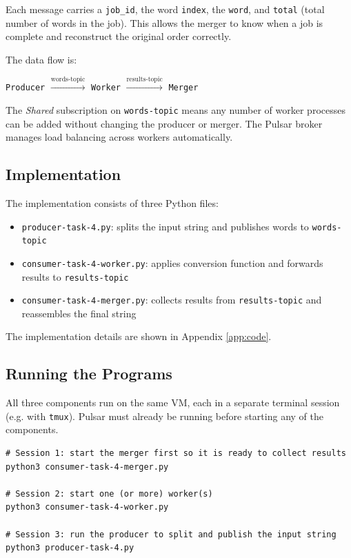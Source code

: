 \documentclass[11pt,a4paper]{article}
\begin{document}
Each message carries a \texttt{job\_id}, the word \texttt{index}, the \texttt{word}, and
\texttt{total} (total number of words in the job). This allows the merger to know when a job
is complete and reconstruct the original order correctly.

The data flow is:

\begin{center}
  \texttt{Producer} $\xrightarrow{\text{words-topic}}$ \texttt{Worker} $\xrightarrow{\text{results-topic}}$ \texttt{Merger}
\end{center}

The \textit{Shared} subscription on \texttt{words-topic} means any number of worker
processes can be added without changing the producer or merger. The Pulsar broker manages
load balancing across workers automatically.

\subsection{Implementation}

The implementation consists of three Python files:

\begin{itemize}[leftmargin=1.5cm]
  \item \texttt{producer-task-4.py}: splits the input string and publishes words to \texttt{words-topic}
  \item \texttt{consumer-task-4-worker.py}: applies conversion function and forwards results to \texttt{results-topic}
  \item \texttt{consumer-task-4-merger.py}: collects results from \texttt{results-topic} and reassembles the final string
\end{itemize}

The implementation details are shown in Appendix \ref{app:code}.

\subsection{Running the Programs}

All three components run on the same VM, each in a separate terminal session (e.g. with
\texttt{tmux}). Pulsar must already be running before starting any of the components.

\begin{lstlisting}[style=shell, caption={Starting the merger, worker, and producer in separate sessions}]
# Session 1: start the merger first so it is ready to collect results
python3 consumer-task-4-merger.py

# Session 2: start one (or more) worker(s)
python3 consumer-task-4-worker.py

# Session 3: run the producer to split and publish the input string
python3 producer-task-4.py
\end{lstlisting}
\end{document}
